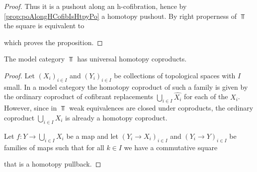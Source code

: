 \begin{prop}
\begin{proof}
        Thus it is a pushout along an h-cofibration, hence by \cref{prop:poAlongHCofibIsHtpyPo} a homotopy pushout.
        By right properness of $\Top$ the square is equivalent to 
        \begin{center}
        \end{center}
        which proves the proposition.
    \end{proof}
\end{prop}
\begin{lemma}\label{lem:topUniversalCoproduct}
    The model category $\Top$ has universal homotopy coproducts.
    \begin{proof}
        	Let $\left(X_i\right)_{i\in I}$ and $\left(Y_i\right)_{i\in I}$ be collections of topological spaces with $I$ small. 
            In a model category the homotopy coproduct of such a family is given by the ordinary coproduct of cofibrant replacements $\bigcup\limits_{i\in I}\widehat{X_i}$ for each of the $X_i$.
            However, since in $\Top$ weak equivalences are closed under coproducts, the ordinary coproduct $\bigcup\limits_{i\in I}X_i$ is already a homotopy coproduct.

            Let $f\colon Y\to\bigcup\limits_{i\in I}X_i$ be a map and let $\left(Y_i\to X_i\right)_{i\in I}$ and $\left(Y_i\to Y\right)_{i\in I}$ be families of maps such that for all $k\in I$ we have a commutative square
            \begin{center}
            \end{center}
            that is a homotopy pullback.


\end{proof}
\end{lemma}
